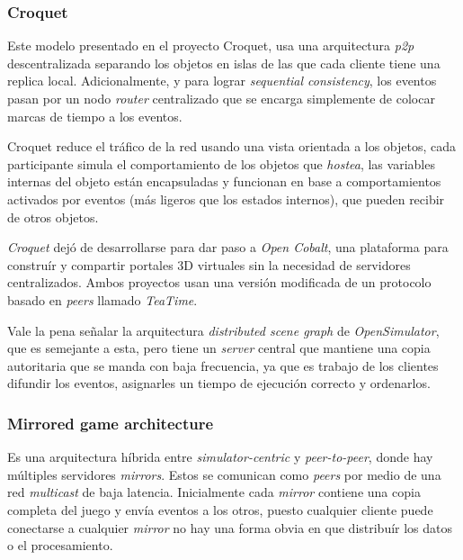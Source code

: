 \subsubsection{Croquet}

Este modelo presentado en el proyecto Croquet, usa una arquitectura \emph{p2p} descentralizada separando los objetos en islas de las que cada cliente tiene una replica local. Adicionalmente, y para lograr \emph{sequential consistency}, los eventos pasan por un nodo \emph{router} centralizado que se encarga simplemente de colocar marcas de tiempo a los eventos.

Croquet reduce el tráfico de la red usando una vista orientada a los objetos, cada participante simula el comportamiento de los objetos que \emph{hostea}, las variables internas del objeto están encapsuladas y funcionan en base a comportamientos activados por eventos (más ligeros que los estados internos), que pueden recibir de otros objetos.

\emph{Croquet} dejó de desarrollarse para dar paso a \emph{Open Cobalt}, una plataforma para construír y compartir portales 3D virtuales sin la necesidad de servidores centralizados. Ambos proyectos usan una versión modificada de un protocolo basado en \emph{peers} llamado \emph{TeaTime}.

Vale la pena señalar la arquitectura \emph{distributed scene graph} de \emph{OpenSimulator}, que es semejante a esta, pero tiene un \emph{server} central que mantiene una copia autoritaria que se manda con baja frecuencia, ya que es trabajo de los clientes difundir los eventos, asignarles un tiempo de ejecución correcto y ordenarlos.

\subsubsection{Mirrored game architecture}

Es una arquitectura híbrida entre \emph{simulator-centric} y \emph{peer-to-peer}, donde hay múltiples servidores \emph{mirrors}. Estos se comunican como \emph{peers} por medio de una red \emph{multicast} de baja latencia. Inicialmente cada \emph{mirror} contiene una copia completa del juego y envía eventos a los otros, puesto cualquier cliente puede conectarse a cualquier \emph{mirror} no hay una forma obvia en que distribuír los datos o el procesamiento.




